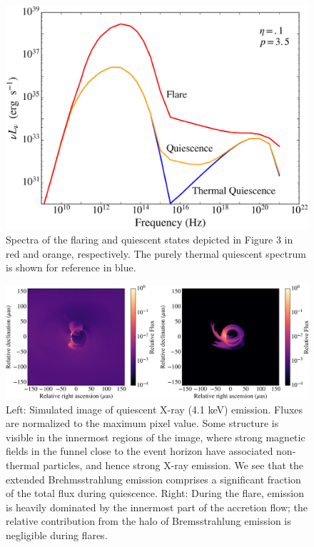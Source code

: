 \begin{figure}
	\centering
	\includegraphics[angle=0,width=\columnwidth]{paper1_fig3}
	\caption{Spectra of the flaring and quiescent states depicted in Figure 3 in red and orange, respectively.  The purely thermal quiescent spectrum is shown for reference in blue. }
	\label{fig4}
\end{figure}

\begin{figure}
	\centering
	\includegraphics[angle=0,width=\columnwidth]{paper1_fig5}
	\caption{Left: Simulated image of quiescent X-ray (4.1 keV) emission. Fluxes are normalized to the maximum pixel value. Some
		structure is visible in the innermost regions of the image, where strong magnetic fields in the funnel close to the event horizon have
		associated non-thermal particles, and hence strong X-ray emission. We see that the extended Brehmsstrahlung emission comprises a
		significant fraction of the total flux during quiescence. Right: During the flare, emission is heavily dominated by the innermost part of the
		accretion flow; the relative contribution from the halo of Bremsstrahlung emission is negligible during flares.}
	\label{fig5}
\end{figure}

